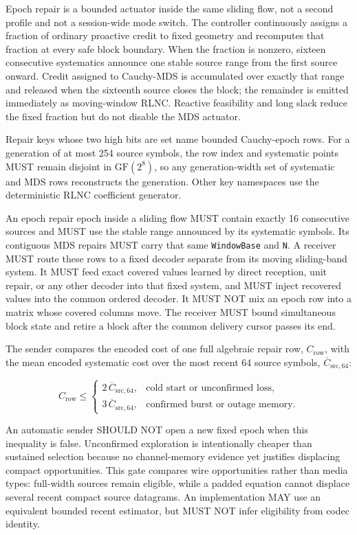 \documentclass[11pt]{article}
\newcommand{\code}[1]{\ifmmode\text{\texttt{#1}}\else\texttt{#1}\fi}
\newcommand{\field}[1]{\code{#1}}
\newcommand{\gf}{\ensuremath{\mathrm{GF}(2^8)}}
\begin{document}
Epoch repair is a bounded actuator inside the same sliding flow, not a
second profile and not a session-wide mode switch. The controller continuously
assigns a fraction of ordinary proactive credit to fixed geometry and recomputes
that fraction at every safe block boundary. When the fraction is nonzero,
sixteen consecutive systematics announce one stable source range from the first
source onward. Credit assigned to Cauchy-MDS is accumulated over exactly that
range and released when the sixteenth source closes the block; the remainder is
emitted immediately as moving-window RLNC. Reactive feasibility and long slack
reduce the fixed fraction but do not disable the MDS actuator.

Repair keys whose two high bits are set name bounded Cauchy-epoch rows. For a
generation of at most 254 source symbols, the row index and systematic points
MUST remain disjoint in \gf{}, so any generation-width set of systematic and MDS
rows reconstructs the generation. Other key namespaces use the deterministic
RLNC coefficient generator.

An epoch repair epoch inside a sliding flow MUST contain exactly 16
consecutive sources and MUST use the stable range announced by its systematic
symbols. Its contiguous MDS repairs MUST carry that same \field{WindowBase} and
\field{N}=16. A receiver MUST route these rows to a fixed decoder separate from
its moving sliding-band system. It MUST feed exact
covered values learned by direct reception, unit repair, or any other decoder into
that fixed system, and MUST inject recovered values into the common ordered
decoder. It MUST NOT mix an epoch row into a matrix whose covered columns move.
The receiver MUST bound simultaneous block state and retire a block after the
common delivery cursor passes its end.

The sender compares the encoded cost of one full algebraic repair row,
$C_{\mathrm{row}}$, with the mean encoded systematic cost over the most recent
64 source symbols, $\overline{C}_{\mathrm{src},64}$:

\[
  C_{\mathrm{row}} \leq
  \begin{cases}
    2\,\overline{C}_{\mathrm{src},64}, & \text{cold start or unconfirmed loss},\\
    3\,\overline{C}_{\mathrm{src},64}, & \text{confirmed burst or outage memory}.
  \end{cases}
\]

An automatic sender SHOULD NOT open a new fixed epoch when this inequality is
false. Unconfirmed exploration is intentionally cheaper than sustained selection
because no channel-memory evidence yet justifies displacing compact opportunities. This
gate compares wire opportunities rather than media types: full-width sources
remain eligible, while a padded equation cannot displace several recent compact
source datagrams. An implementation MAY use an equivalent bounded recent estimator,
but MUST NOT infer eligibility from codec identity.
\end{document}
